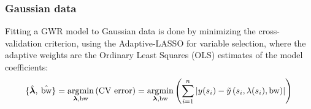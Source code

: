 \documentclass[10pt]{amsart}
\DeclareMathOperator*{\argmin}{\arg\!\min}
\DeclareMathOperator*{\bw}{\mbox{bw}}
\newcommand{\vect}[1]{\boldsymbol{#1}}
\begin{document}
		\subsubsection{Gaussian data}
		Fitting a GWR model to Gaussian data is done by minimizing the cross-validation criterion, using the Adaptive-LASSO for variable selection, where the adaptive weights are the Ordinary Least Squares (OLS) estimates of the model coefficients:
		 \[
			\{ \hat{\vect{\lambda}}, \: \hat{\bw} \} = \argmin_{\vect{\lambda}, \text{bw}} \left( \mbox{CV error} \right)  = \argmin_{\vect{\lambda}, \text{bw}} \left( \sum_{i = 1}^n \left| y(s_i)-\tilde{y}\left(s_i, \lambda(s_i), \bw \right) \right| \right)\\
		\]
		
\end{document}
